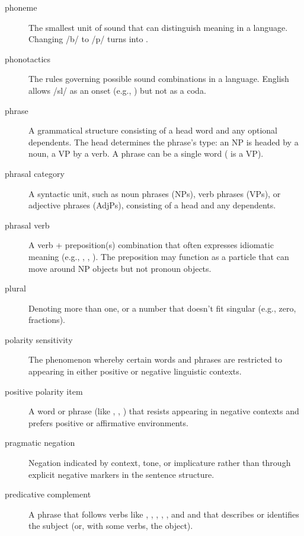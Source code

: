 \begin{description}
\item[phoneme] The smallest unit of sound that can distinguish meaning in a language. Changing /b/ to /p/ turns  into .

\item[phonotactics] The rules governing possible sound combinations in a language. English allows /sl/ as an onset (e.g., ) but not as a coda.

\item[phrase] A grammatical structure consisting of a head word and any optional dependents. The head determines the phrase's type: an NP is headed by a noun, a VP by a verb. A phrase can be a single word ( is a VP).

\item[phrasal category] A syntactic unit, such as noun phrases (NPs), verb phrases (VPs), or adjective phrases (AdjPs), consisting of a head and any dependents.

\item[phrasal verb] A verb + preposition(s) combination that often expresses idiomatic meaning (e.g., , , ). The preposition may function as a particle that can move around NP objects but not pronoun objects.

\item[plural] Denoting more than one, or a number that doesn't fit singular (e.g., zero, fractions).

\item[polarity sensitivity] The phenomenon whereby certain words and phrases are restricted to appearing in either positive or negative linguistic contexts.

\item[positive polarity item] A word or phrase (like , , ) that resists appearing in negative contexts and prefers positive or affirmative environments.

\item[pragmatic negation] Negation indicated by context, tone, or implicature rather than through explicit negative markers in the sentence structure.

\item[predicative complement] A phrase that follows verbs like , , , , , and  and that describes or identifies the subject (or, with some verbs, the object).


\end{description}
